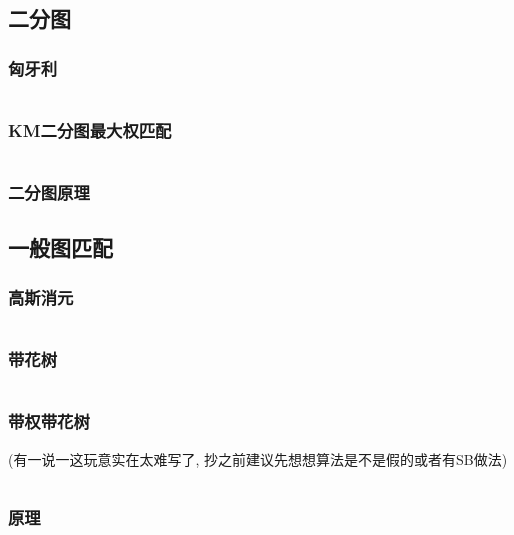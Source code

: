 \documentclass[a4paper]{article}
\begin{document}
\begin{multicols}{2}
			\subsection{二分图}
				\subsubsection{匈牙利}
					\inputminted{cpp}{../src/graph/hungary.cpp}



				\subsubsection{KM二分图最大权匹配}
					\inputminted{cpp}{../src/graph/KM二分图最大权匹配.cpp}

				\subsubsection{二分图原理}
					
			
			\subsection{一般图匹配}
				\subsubsection{高斯消元}
					\inputminted{cpp}{../src/graph/基于线性代数的一般图匹配.cpp}

				\subsubsection{带花树}
					\inputminted{cpp}{../src/graph/带花树.cpp}
				
				\subsubsection{带权带花树}
					(有一说一这玩意实在太难写了, 抄之前建议先想想算法是不是假的或者有SB做法)
					\inputminted{cpp}{../src/graph/带权带花树.cpp}
				
				\subsubsection{原理}
					


\end{multicols}
\end{document}
